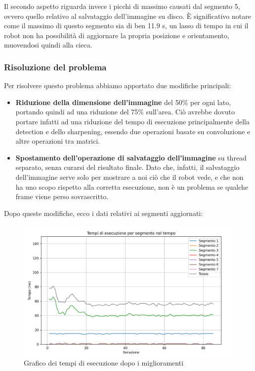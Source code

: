 \documentclass[]{article}
\begin{document}
Il secondo aspetto riguarda invece i picchi di massimo causati dal segmento 5, ovvero quello relativo al salvataggio dell'immagine su disco. È significativo notare come il massimo di questo segmento sia di ben 11.9 s, un lasso di tempo in cui il robot non ha possibilità di aggiornare la propria posizione e orientamento, muovendosi quindi alla cieca.

\subsubsection*{Risoluzione del problema}

Per risolvere questo problema abbiamo apportato due modifiche principali:
\begin{itemize}
    \item \textbf{Riduzione della dimensione dell'immagine} del 50\% per ogni lato, portando quindi ad una riduzione del 75\% sull'area. Ciò avrebbe dovuto portare infatti ad una riduzione del tempo di esecuzione principalmente della detection e dello sharpening, essendo due operazioni basate su convoluzione e altre operazioni tra matrici.
    \item \textbf{Spostamento dell'operazione di salvataggio dell'immagine} su thread separato, senza curarsi del risultato finale. Dato che, infatti, il salvataggio dell'immagine serve solo per mostrare a noi ciò che il robot vede, e che non ha uno scopo rispetto alla corretta esecuzione, non è un problema se qualche frame viene perso  sovrascritto.
\end{itemize}
Dopo queste modifiche, ecco i dati relativi ai segmenti aggiornati:

\begin{figure}[H]
    \centering
    \includegraphics[width=0.7\linewidth]{immagini/grafico_tags_dopo_le_modifiche.png}
    \caption{Grafico dei tempi di esecuzione dopo i miglioramenti}
\end{figure}
\end{document}
